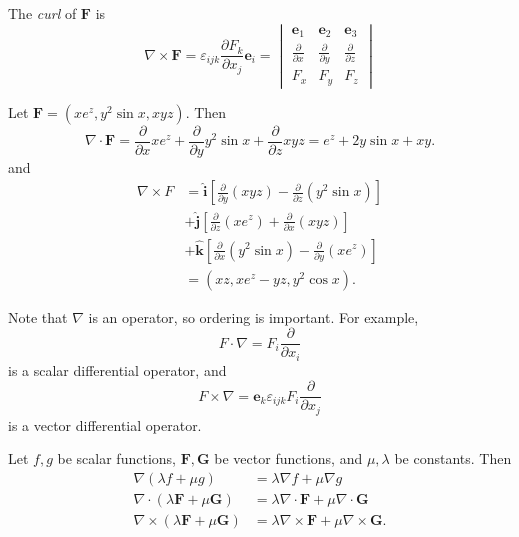 \documentclass[a4paper]{article}
\begin{document}
\begin{defi}[Curl]
  The \emph{curl} of $\mathbf{F}$ is
  \[
    \nabla\times \mathbf{F} = \varepsilon_{ijk}\frac{\partial F_k}{\partial x_j}\mathbf{e}_i = \begin{vmatrix}
      \mathbf{e}_1 & \mathbf{e}_2 & \mathbf{e}_3\\
      \frac{\partial}{\partial x} & \frac{\partial}{\partial y} & \frac{\partial}{\partial z}\\
      F_x & F_y & F_z
    \end{vmatrix}
  \]
\end{defi}

\begin{eg}
  Let $\mathbf{F} = (xe^z, y^2\sin x, xyz)$. Then
  \[
    \nabla \cdot \mathbf{F} = \frac{\partial }{\partial x}xe^z + \frac{\partial}{\partial y}y^2 \sin x + \frac{\partial}{\partial z}xyz = e^z + 2y\sin x + xy.
  \]
  and
  \begin{align*}
    \nabla \times F &= \hat{\mathbf{i}} \left[\frac{\partial}{\partial y}(xyz) - \frac{\partial}{\partial z}(y^2\sin x)\right]\\
    &+ \hat{\mathbf{j}} \left[\frac{\partial}{\partial z}(xe^z) + \frac{\partial}{\partial x}(xyz)\right]\\
    &+ \hat{\mathbf{k}}\left[\frac{\partial}{\partial x}(y^2\sin x) - \frac{\partial}{\partial y} (xe^z)\right]\\
    &= (xz, xe^z - yz, y^2\cos x).
  \end{align*}
\end{eg}
Note that $\nabla$ is an operator, so ordering is important. For example,
\[
  F\cdot \nabla = F_i\frac{\partial }{\partial x_i}
\]
is a scalar differential operator, and
\[
  F\times \nabla = \mathbf{e}_k\varepsilon_{ijk}F_i\frac{\partial}{\partial x_j}
\]
is a vector differential operator.

\begin{prop}
  Let $f, g$ be scalar functions, $\mathbf{F}, \mathbf{G}$ be vector functions, and $\mu, \lambda$ be constants. Then
  \begin{align*}
    \nabla(\lambda f + \mu g) &= \lambda\nabla f + \mu\nabla g\\
    \nabla\cdot (\lambda \mathbf{F} + \mu \mathbf{G}) &= \lambda\nabla \cdot \mathbf{F} + \mu\nabla\cdot \mathbf{G}\\
    \nabla\times (\lambda \mathbf{F} + \mu \mathbf{G}) &= \lambda\nabla\times \mathbf{F} + \mu\nabla\times \mathbf{G}.
  \end{align*}
\end{prop}
\end{document}
